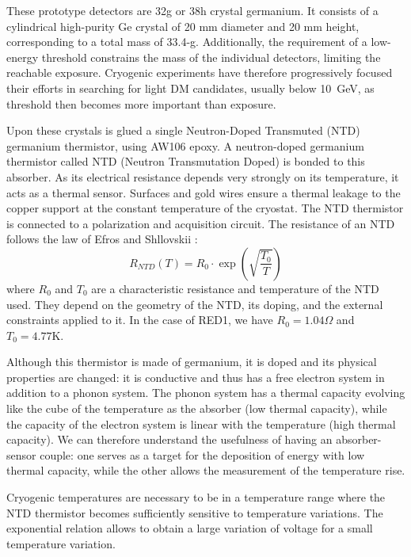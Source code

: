 These prototype detectors are 32g or 38h crystal germanium. It consists of a cylindrical high-purity Ge crystal of 20 mm diameter and 20 mm height, corresponding to a total mass of 33.4-g. 
Additionally, the requirement of a low-energy threshold constrains the mass of the individual detectors, limiting the reachable exposure. Cryogenic experiments have therefore progressively focused their efforts in searching for light DM candidates, usually below 10~GeV, as threshold then becomes more important than exposure.


Upon these crystals is glued a single Neutron-Doped Transmuted (NTD) germanium thermistor, using AW106 epoxy. A neutron-doped germanium thermistor called NTD (Neutron Transmutation Doped) is bonded to this absorber. As its electrical resistance depends very strongly on its temperature, it acts as a thermal sensor.  Surfaces and gold wires ensure a thermal leakage to the copper support at the constant temperature of the cryostat. The NTD thermistor is connected to a polarization and acquisition circuit. The resistance of an NTD follows the law of Efros and Shllovskii \cite{mccammon}:
\begin{equation}
\label{eq:ntd-resistivity}
R_{NTD}(T) = R_0 \cdot \exp(\sqrt{\frac{T_0}{T}})
\end{equation}
where $R_0$ and $T_0$ are a characteristic resistance and temperature of the NTD used. They depend on the geometry of the NTD, its doping, and the external constraints applied to it. In the case of RED1, we have $R_0=1.04 \Omega$ and $T_0=4.77 \textrm{K}$.

Although this thermistor is made of germanium, it is doped and its physical properties are changed: it is conductive and thus has a free electron system in addition to a phonon system. The phonon system has a thermal capacity evolving like the cube of the temperature as the absorber (low thermal capacity), while the capacity of the electron system is linear with the temperature (high thermal capacity). We can therefore understand the usefulness of having an absorber-sensor couple: one serves as a target for the deposition of energy with low thermal capacity, while the other allows the measurement of the temperature rise.

Cryogenic temperatures are necessary to be in a temperature range where the NTD thermistor becomes sufficiently sensitive to temperature variations.
The exponential relation allows to obtain a large variation of voltage for a small temperature variation.

